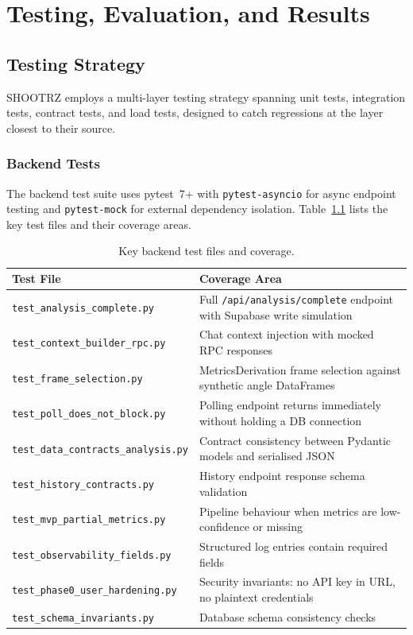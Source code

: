 \chapter{Testing, Evaluation, and Results}
\label{chap:evaluation}

\section{Testing Strategy}
\label{sec:testing_strategy}

SHOOTRZ employs a multi-layer testing strategy spanning unit tests, integration tests, contract tests, and load tests, designed to catch regressions at the layer closest to their source.

\subsection{Backend Tests}

The backend test suite uses pytest~7+ with \lstinline|pytest-asyncio| for async endpoint testing and \lstinline|pytest-mock| for external dependency isolation. Table~\ref{tab:backend_tests} lists the key test files and their coverage areas.

\begin{table}[H]
  \centering
  \caption{Key backend test files and coverage.}
  \label{tab:backend_tests}
  \begin{tabularx}{\textwidth}{l>{\raggedright\arraybackslash}X}
    \toprule
    \textbf{Test File} & \textbf{Coverage Area} \\
    \midrule
    \lstinline|test_analysis_complete.py| & Full \lstinline|/api/analysis/complete| endpoint with Supabase write simulation \\
    \lstinline|test_context_builder_rpc.py| & Chat context injection with mocked RPC responses \\
    \lstinline|test_frame_selection.py| & MetricsDerivation frame selection against synthetic angle DataFrames \\
    \lstinline|test_poll_does_not_block.py| & Polling endpoint returns immediately without holding a DB connection \\
    \lstinline|test_data_contracts_analysis.py| & Contract consistency between Pydantic models and serialised JSON \\
    \lstinline|test_history_contracts.py| & History endpoint response schema validation \\
    \lstinline|test_mvp_partial_metrics.py| & Pipeline behaviour when metrics are low-confidence or missing \\
    \lstinline|test_observability_fields.py| & Structured log entries contain required fields \\
    \lstinline|test_phase0_user_hardening.py| & Security invariants: no API key in URL, no plaintext credentials \\
    \lstinline|test_schema_invariants.py| & Database schema consistency checks \\
    \bottomrule
  \end{tabularx}
\end{table}

